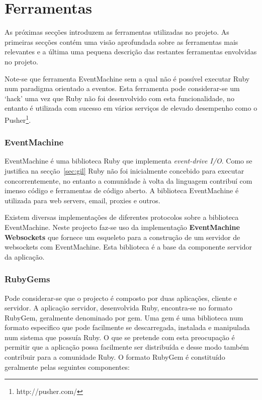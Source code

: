 \section{Ferramentas}

As próximas secções introduzem as ferramentas utilizadas no projeto. As primeiras secções contém uma visão aprofundada sobre as ferramentas mais relevantes e a última uma pequena descrição das restantes ferramentas envolvidas no projeto.

Note-se que ferramenta EventMachine sem a qual não é possível executar Ruby num paradigma orientado a eventos. Esta ferramenta pode considerar-se um `hack' uma vez que Ruby não foi desenvolvido com esta funcionalidade, no entanto é utilizada com sucesso em vários serviços de elevado desempenho como o Pusher\footnote{http://pusher.com/}.

\subsubsection{EventMachine}
\label{sec:eventmachine}

EventMachine é uma biblioteca Ruby que implementa \textit{event-drive I/O}. Como se justifica na secção~\ref{sec:gil} Ruby não foi inicialmente concebido para executar concorrentemente, no entanto a comunidade à volta da linguagem contribuí com imenso código e ferramentas de código aberto. A biblioteca EventMachine é utilizada para web servers, email, proxies e outros.

Existem diversas implementações de diferentes protocolos sobre a biblioteca EventMachine. Neste projecto faz-se uso da implementação \textbf{EventMachine Websockets} que fornece um esqueleto para a construção de um servidor de websockets com EventMachine. Esta biblioteca é a base da componente servidor da aplicação.

\subsubsection{RubyGems}

Pode considerar-se que o projecto é composto por duas aplicações, cliente e servidor. A aplicação servidor, desenvolvida Ruby, encontra-se no formato RubyGem, geralmente denominado por gem. Uma gem é uma biblioteca num formato especifico que pode facilmente se descarregada, instalada e manipulada num sistema que possuía Ruby.\cite{rubygems} O que se pretende com esta preocupação é permitir que a aplicação possa facilmente ser distribuída e desse modo também contribuir para a comunidade Ruby. O formato RubyGem é constituído geralmente pelas seguintes componentes:

